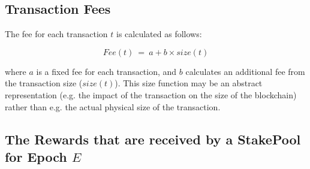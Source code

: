 \documentclass[11pt,a4paper,dvipsnames,twosided,final]{article}
\begin{document}
\subsection{Transaction Fees}
\label{sec:fees}

The fee for each transaction $t$ is calculated as follows:

$$
\textit{Fee} (t) ~=~ a + b \times \textit{size}(t)
$$

\noindent
where $a$ is a fixed fee for each transaction, and $b$ calculates an additional fee from the transaction size ($\textit{size}(t)$).
This size function may be an abstract representation (e.g. the impact of the transaction on the size of the blockchain) rather than e.g.
the actual physical size of the transaction.

\clearpage
\subsection{The Rewards that are received by a StakePool for Epoch $E$}
\end{document}
